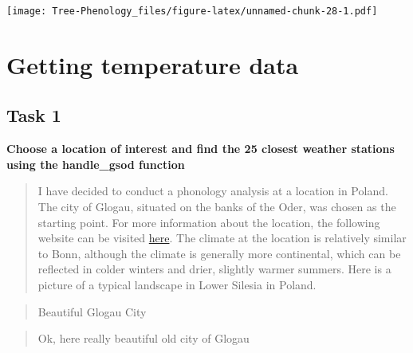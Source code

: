 \documentclass[
]{book}
\begin{document}
\texttt{[image: Tree-Phenology\_files/figure-latex/unnamed-chunk-28-1.pdf]}

\hypertarget{getting-temperature-data}{%
\chapter{Getting temperature data}\label{getting-temperature-data}}

\hypertarget{task-1-5}{%
\section{Task 1}\label{task-1-5}}

\textbf{Choose a location of interest and find the 25 closest weather stations using the handle\_gsod function}

\begin{quote}
I have decided to conduct a phonology analysis at a location in Poland. The city of Glogau, situated on the banks of the Oder, was chosen as the starting point. For more information about the location, the following website can be visited \href{https://de.wikipedia.org/wiki/G\%C5\%82og\%C3\%B3w}{here}.
The climate at the location is relatively similar to Bonn, although the climate is generally more continental, which can be reflected in colder winters and drier, slightly warmer summers.
Here is a picture of a typical landscape in Lower Silesia in Poland.
\end{quote}

\begin{quote}
Beautiful Glogau City
\end{quote}

\begin{quote}
Ok, here really beautiful old city of Glogau
\end{quote}
\end{document}
